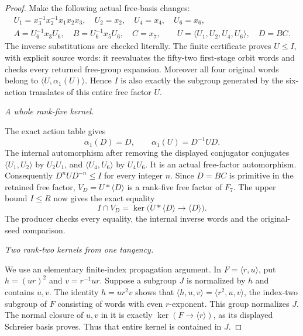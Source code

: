 \begin{proof}
Make the following actual free-basis changes:
\[
\begin{gathered}
 U_1=x_3^{-1}x_2^{-1}x_1x_2x_3,\quad
 U_2=x_2,\quad U_4=x_4,\quad U_6=x_6,\\
 A=U_6^{-1}x_3U_6,\quad B=U_6^{-1}x_5U_6,\quad C=x_7,\qquad
 U=\langle U_1,U_2,U_4,U_6\rangle,\quad D=BC.
\end{gathered}
 \tag{B.81.9}
\]
The inverse substitutions are checked literally. The finite certificate
 proves \(U\leq I\), with explicit
source words: it reevaluates the fifty-two first-stage orbit words and
checks every returned free-group expansion. Moreover all four original
words belong to \(\langle U,\alpha_1(U)\rangle\). Hence \(I\) is
also exactly the subgroup generated by the six-action translates of
this entire free factor \(U\).

\emph{A whole rank-five kernel.}\par
The exact action table gives
\[
 \alpha_1(D)=D,\qquad
 \alpha_1(U)=D^{-1}UD.
 \tag{B.81.10}
\]
The internal automorphism after removing the displayed conjugator
conjugates \(\langle U_1,U_2\rangle\) by \(U_2U_1\), and
\(\langle U_4,U_6\rangle\) by \(U_4U_6\). It is an actual
free-factor automorphism. Consequently
\(D^nUD^{-n}\leq I\) for every integer \(n\).
Since \(D=BC\) is primitive in the retained free factor,
\(V_D=U*\langle D\rangle\) is a rank-five free factor of \(F_7\).
The upper bound \(I\leq R\) now gives the exact equality
\[
 I\cap V_D
    =\ker\bigl(U*\langle D\rangle\longrightarrow\langle D\rangle\bigr).
 \tag{B.81.11}
\]
The producer  checks every equality,
the internal inverse words and the original-seed comparison.

\emph{Two rank-two kernels from one tangency.}\par
We use an elementary finite-index propagation argument. In
\(F=\langle r,u\rangle\), put \(h=(ur)^2\) and
\(v=r^{-1}ur\). Suppose a subgroup \(J\) is normalized by \(h\)
and contains \(u,v\). The identity \(h=ur^2v\) shows that
\(\langle h,u,v\rangle=\langle r^2,u,v\rangle\), the index-two
subgroup of \(F\) consisting of words with even \(r\)-exponent.
This group normalizes \(J\). The normal closure of \(u,v\) in it
is exactly \(\ker(F\to\langle r\rangle)\), as its displayed
Schreier basis proves. Thus that entire kernel is contained in \(J\).


\end{proof}
